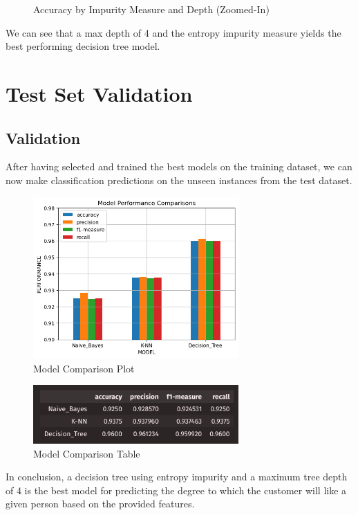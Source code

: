 \documentclass{article}
\begin{document}
\begin{figure}[H]
\begin{minipage}[t]{0.49\textwidth}
            \caption{\small{Accuracy by Impurity Measure and Depth (Zoomed-In)}}
        \end{minipage}
    \end{figure}

    We can see that a max depth of 4 and the entropy impurity measure yields the best
    performing decision tree model. 

    \newpage

\section*{Test Set Validation}

    \subsection*{Validation}

    After having selected and trained the best models on the training dataset, we can now
    make classification predictions on the unseen instances from the test dataset.

    \begin{figure}[H]
        \centering
        \includegraphics[width=0.7\textwidth, height=0.4\textheight]{comparison.png}
        \caption{\small{Model Comparison Plot}}
    \end{figure}
    \begin{figure}[H]
        \centering
        \includegraphics[width=0.7\textwidth, height=0.15\textheight]{comparison_table.png}
        \caption{\small{Model Comparison Table}}
    \end{figure}

    In conclusion, a decision tree using entropy impurity and a maximum tree depth of 4
    is the best model for predicting the degree to which the customer will like a given
    person based on the provided features.
\end{document}
